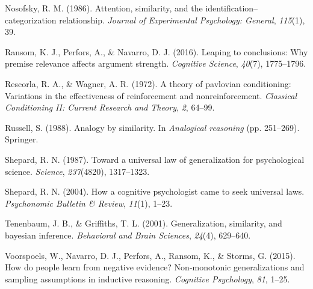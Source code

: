 \documentclass[english,doc]{apa6}
\begin{document}
\leavevmode\hypertarget{ref-nosofsky1986attention}{}%
Nosofsky, R. M. (1986). Attention, similarity, and the identification--categorization relationship. \emph{Journal of Experimental Psychology: General}, \emph{115}(1), 39.

\leavevmode\hypertarget{ref-ransom2016leaping}{}%
Ransom, K. J., Perfors, A., \& Navarro, D. J. (2016). Leaping to conclusions: Why premise relevance affects argument strength. \emph{Cognitive Science}, \emph{40}(7), 1775--1796.

\leavevmode\hypertarget{ref-rescorla1972theory}{}%
Rescorla, R. A., \& Wagner, A. R. (1972). A theory of pavlovian conditioning: Variations in the effectiveness of reinforcement and nonreinforcement. \emph{Classical Conditioning II: Current Research and Theory}, \emph{2}, 64--99.

\leavevmode\hypertarget{ref-russell1988analogy}{}%
Russell, S. (1988). Analogy by similarity. In \emph{Analogical reasoning} (pp. 251--269). Springer.

\leavevmode\hypertarget{ref-shepard1987toward}{}%
Shepard, R. N. (1987). Toward a universal law of generalization for psychological science. \emph{Science}, \emph{237}(4820), 1317--1323.

\leavevmode\hypertarget{ref-shepard2004cognitive}{}%
Shepard, R. N. (2004). How a cognitive psychologist came to seek universal laws. \emph{Psychonomic Bulletin \& Review}, \emph{11}(1), 1--23.

\leavevmode\hypertarget{ref-tenenbaum2001generalization}{}%
Tenenbaum, J. B., \& Griffiths, T. L. (2001). Generalization, similarity, and bayesian inference. \emph{Behavioral and Brain Sciences}, \emph{24}(4), 629--640.

\leavevmode\hypertarget{ref-voorspoels2015people}{}%
Voorspoels, W., Navarro, D. J., Perfors, A., Ransom, K., \& Storms, G. (2015). How do people learn from negative evidence? Non-monotonic generalizations and sampling assumptions in inductive reasoning. \emph{Cognitive Psychology}, \emph{81}, 1--25.
\end{document}
